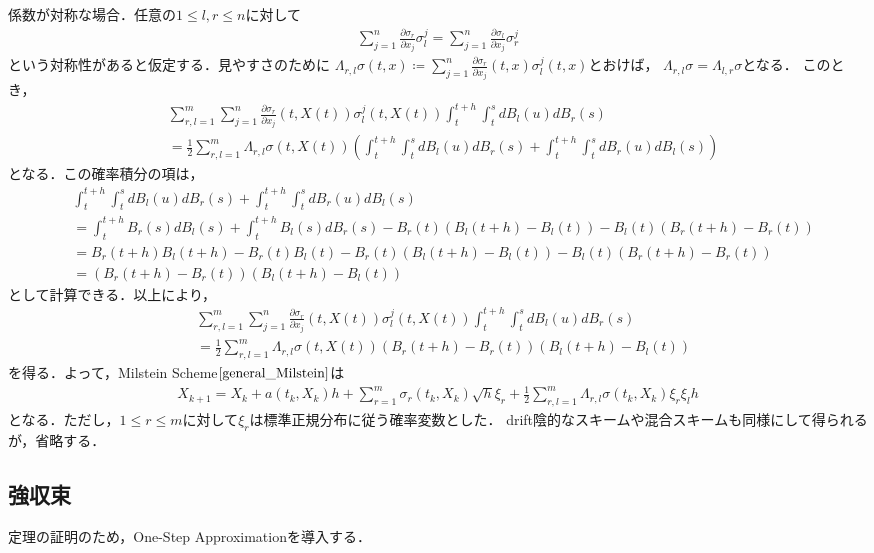 \documentclass[dvipdfmx,autodetect-engine]{jsarticle}
\theoremstyle{remark}
\theoremstyle{definition}
\begin{document}
係数が対称な場合．任意の$1\leq l,r\leq n$に対して
\begin{align}
    \sum_{j=1}^{n} \frac{\partial \sigma_{r}}{\partial x_{j}} \sigma_{l}^{j}
    = \sum_{j=1}^{n} \frac{\partial \sigma_{l}}{\partial x_{j}} \sigma_{r}^{j}
\end{align}
という対称性があると仮定する．見やすさのために
$\Lambda_{r,l}\sigma (t,x) \coloneqq \sum_{j=1}^{n} 
\frac{\partial \sigma_{r}}{\partial x_{j}} (t,x) \sigma_{l}^{j}(t,x)$とおけば，
$\Lambda_{r,l}\sigma = \Lambda_{l,r}\sigma$となる．
このとき，
\begin{align}
    & \sum_{r,l=1}^{m} \sum_{j=1}^{n} 
        \frac{\partial \sigma_{r}}{\partial x_{j}}(t,X(t)) \sigma_{l}^{j}(t,X(t)) 
        \int_{t}^{t+h} \int_{t}^{s} dB_{l}(u) dB_{r}(s)\\
    &= \frac{1}{2} \sum_{r,l=1}^{m} \Lambda_{r,l}\sigma(t,X(t))
    \left(\int_{t}^{t+h} \int_{t}^{s} dB_{l}(u) dB_{r}(s) + 
    \int_{t}^{t+h} \int_{t}^{s} dB_{r}(u) dB_{l}(s)\right)
\end{align}
となる．この確率積分の項は，
\begin{align}
    &\int_{t}^{t+h} \int_{t}^{s} dB_{l}(u) dB_{r}(s) + 
    \int_{t}^{t+h} \int_{t}^{s} dB_{r}(u) dB_{l}(s) \\
    &= \int_{t}^{t+h} B_{r}(s) dB_{l}(s) + \int_{t}^{t+h} B_{l}(s) dB_{r}(s)
    - B_{r}(t)\left(B_{l}(t+h)-B_{l}(t)\right) - B_{l}(t)\left(B_{r}(t+h)-B_{r}(t)\right)\\
    &= B_{r}(t+h)B_{l}(t+h) - B_{r}(t)B_{l}(t)
    - B_{r}(t)(B_{l}(t+h)-B_{l}(t)) - B_{l}(t)(B_{r}(t+h)-B_{r}(t))\\
    &= (B_{r}(t+h)-B_{r}(t)) (B_{l}(t+h)-B_{l}(t))
\end{align}
として計算できる．以上により，
\begin{align}
    &\sum_{r,l=1}^{m} \sum_{j=1}^{n} 
        \frac{\partial \sigma_{r}}{\partial x_{j}}(t,X(t)) \sigma_{l}^{j}(t,X(t)) 
        \int_{t}^{t+h} \int_{t}^{s} dB_{l}(u) dB_{r}(s) \\
    &= \frac{1}{2} \sum_{r,l=1}^{m} \Lambda_{r,l}\sigma(t,X(t))
    (B_{r}(t+h)-B_{r}(t)) (B_{l}(t+h)-B_{l}(t))
\end{align}
を得る．よって，Milstein Scheme$\eqref{general_Milstein}$は
\begin{align}
    X_{k+1} = X_{k} + a(t_{k},X_{k})h 
    + \sum_{r=1}^{m} \sigma_{r}(t_{k},X_{k})\sqrt{h}\xi_{r}
     + \frac{1}{2} \sum_{r,l=1}^{m} \Lambda_{r,l}\sigma(t_{k},X_{k})
    \xi_{r} \xi_{l} h
\end{align}
となる．ただし，$1\leq r\leq m$に対して$\xi_{r}$は標準正規分布に従う確率変数とした．
drift陰的なスキームや混合スキームも同様にして得られるが，省略する．

\subsection{強収束}
定理の証明のため，One-Step Approximationを導入する．
\end{document}
